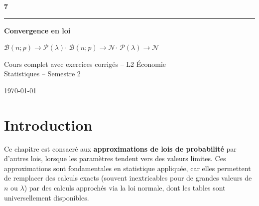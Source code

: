 \documentclass[11pt,a4paper]{article}
\begin{document}
\thispagestyle{empty}
\begin{center}
\vspace*{4cm}

{\fontsize{72}{80}\selectfont\sffamily\bfseries\color{deepblue}7}

\vspace{0.5cm}
{\color{lightblue}\rule{8cm}{2pt}}
\vspace{0.6cm}

{\LARGE\sffamily\bfseries\color{deepblue}Convergence en loi}

\vspace{1.5cm}

{\large\sffamily\color{textlight}%
$\mathcal{B}(n;p) \to \mathcal{P}(\lambda)$\quad$\cdot$\quad
$\mathcal{B}(n;p) \to \mathcal{N}$\quad$\cdot$\quad
$\mathcal{P}(\lambda) \to \mathcal{N}$}

\vspace{2.5cm}

{\sffamily\color{textlight}Cours complet avec exercices corrig\'es -- L2 \'Economie\\[0.3cm]
Statistiques -- Semestre 2}

\vfill

{\small\sffamily\color{textlight}\today}
\end{center}

\newpage

\thispagestyle{empty}
{\hypersetup{linkcolor=textmain}
\tableofcontents}
\newpage

\section*{Introduction}

Ce chapitre est consacr\'e aux \textbf{approximations de lois de probabilit\'e} par d'autres lois, lorsque les param\`etres tendent vers des valeurs limites. Ces approximations sont fondamentales en statistique appliqu\'ee, car elles permettent de remplacer des calculs exacts (souvent inextricables pour de grandes valeurs de $n$ ou $\lambda$) par des calculs approch\'es via la loi normale, dont les tables sont universellement disponibles.
\end{document}
